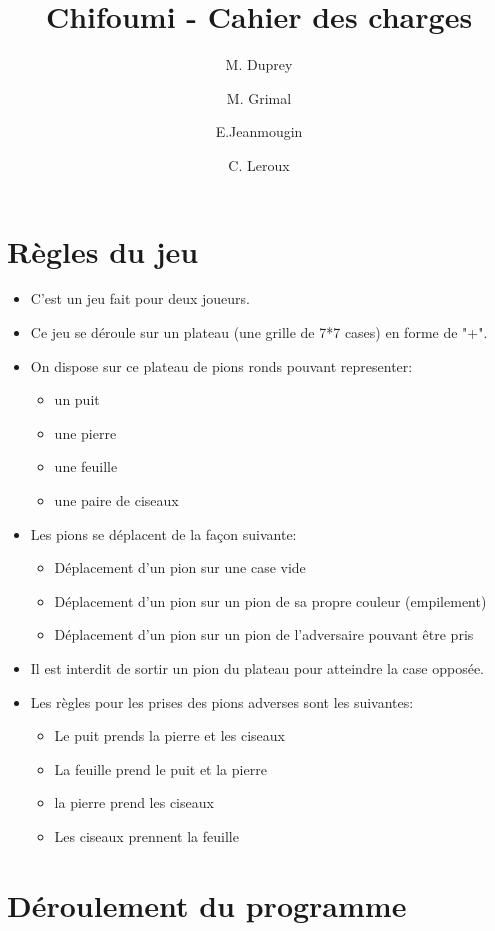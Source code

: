 \documentclass{article}
\begin{document}
 
\title{Chifoumi - Cahier des charges}
\author{M. Duprey \and M. Grimal \and E.Jeanmougin \and C. Leroux}
 
 
 \maketitle
 
 \newpage
 \tableofcontents
\newpage

\section{Règles du jeu}

\begin{itemize}
 \item C'est un jeu fait pour deux joueurs.
 \item Ce jeu se déroule sur un plateau (une grille de 7*7 cases) en forme de "+".
 \item On dispose sur ce plateau de pions ronds pouvant representer:
 \begin{itemize}
    \item[\textbullet] un puit
    \item[\textbullet] une pierre
    \item[\textbullet] une feuille
    \item[\textbullet] une paire de ciseaux
 \end{itemize}
\item Les pions se déplacent de la façon suivante:
\begin{itemize}
  \item[\textbullet]Déplacement d'un pion sur une case vide
  \item[\textbullet]Déplacement d'un pion sur un pion de sa propre couleur (empilement)
  \item[\textbullet]Déplacement d'un pion sur un pion de l'adversaire pouvant être pris
\end{itemize}
  \item Il est interdit de sortir un pion du plateau pour atteindre la case opposée.
  \item Les règles pour les prises des pions adverses sont les suivantes:
\begin{itemize}
  \item[\textbullet]Le puit prends la pierre et les ciseaux
  \item[\textbullet]La feuille prend le puit et la pierre
  \item[\textbullet]la pierre prend les ciseaux
  \item[\textbullet]Les ciseaux prennent la feuille
\end{itemize}

\end{itemize}

\section{Déroulement du programme}
 
\end{document}
